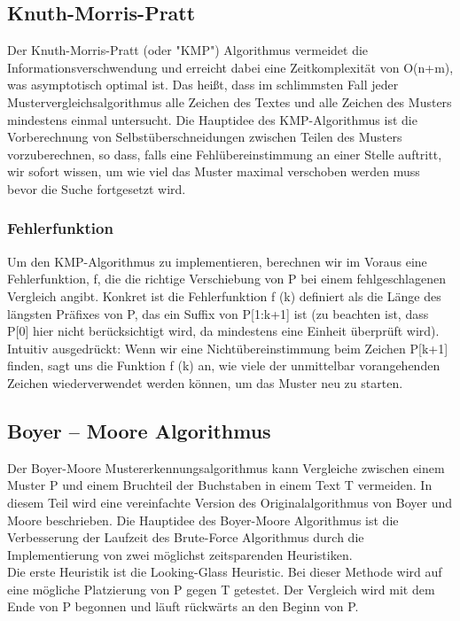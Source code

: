 \documentclass[14pt]{article}
\begin{document}
\subsection{Knuth-Morris-Pratt}

Der Knuth-Morris-Pratt (oder "KMP") Algorithmus vermeidet die Informationsverschwendung und erreicht dabei eine Zeitkomplexität von O(n+m), was asymptotisch optimal ist. Das heißt, dass im schlimmsten Fall jeder Mustervergleichsalgorithmus alle Zeichen des Textes und alle Zeichen des Musters mindestens einmal untersucht. Die Hauptidee des KMP-Algorithmus ist die Vorberechnung von Selbstüberschneidungen zwischen Teilen des Musters vorzuberechnen, so dass, falls eine Fehlübereinstimmung an einer Stelle auftritt, wir sofort wissen, um wie viel das Muster maximal verschoben werden muss bevor die Suche fortgesetzt wird.
\subsubsection{Fehlerfunktion}
Um den KMP-Algorithmus zu implementieren, berechnen wir im Voraus eine Fehlerfunktion, f, die die richtige Verschiebung von P bei einem fehlgeschlagenen Vergleich angibt. Konkret ist die Fehlerfunktion f (k) definiert als die Länge des längsten Präfixes von P, das ein Suffix von P[1:k+1] ist (zu beachten ist, dass P[0] hier nicht berücksichtigt wird, da mindestens eine Einheit überprüft wird). Intuitiv ausgedrückt: Wenn wir eine Nichtübereinstimmung beim Zeichen P[k+1] finden, sagt uns die Funktion f (k) an, wie viele der unmittelbar vorangehenden Zeichen wiederverwendet werden können, um das Muster neu zu starten.


\subsection{Boyer – Moore Algorithmus}
Der Boyer-Moore Mustererkennungsalgorithmus kann Vergleiche zwischen einem Muster P und einem Bruchteil der Buchstaben in einem Text T vermeiden. In diesem Teil wird eine vereinfachte Version des Originalalgorithmus von Boyer und Moore beschrieben.
Die Hauptidee des Boyer-Moore Algorithmus ist die Verbesserung der Laufzeit  des Brute-Force Algorithmus durch die Implementierung von zwei möglichst zeitsparenden Heuristiken. \\

Die erste Heuristik ist die Looking-Glass Heuristic. Bei dieser Methode wird auf eine mögliche Platzierung von P gegen T getestet. Der Vergleich wird mit dem Ende von P begonnen und läuft rückwärts an den Beginn von P.\\
\end{document}
